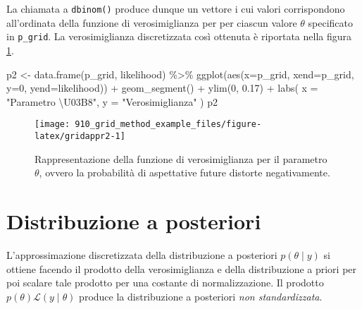 \documentclass[
]{memoir}
\newenvironment{Shaded}{\begin{snugshade}}{\end{snugshade}}
\newcommand{\AttributeTok}[1]{\textcolor[rgb]{0.77,0.63,0.00}{#1}}
\newcommand{\DecValTok}[1]{\textcolor[rgb]{0.00,0.00,0.81}{#1}}
\newcommand{\FloatTok}[1]{\textcolor[rgb]{0.00,0.00,0.81}{#1}}
\newcommand{\FunctionTok}[1]{\textcolor[rgb]{0.00,0.00,0.00}{#1}}
\newcommand{\NormalTok}[1]{#1}
\newcommand{\OtherTok}[1]{\textcolor[rgb]{0.56,0.35,0.01}{#1}}
\newcommand{\SpecialCharTok}[1]{\textcolor[rgb]{0.00,0.00,0.00}{#1}}
\newcommand{\StringTok}[1]{\textcolor[rgb]{0.31,0.60,0.02}{#1}}
\begin{document}
La chiamata a \texttt{dbinom()} produce dunque un vettore i cui valori corrispondono all'ordinata della funzione di verosimiglianza per per ciascun valore \(\theta\) specificato in \texttt{p\_grid}. La verosimiglianza discretizzata così ottenuta è riportata nella figura \ref{fig:gridappr2}.

\begin{Shaded}
\begin{Highlighting}[]
\NormalTok{p2 }\OtherTok{\textless{}{-}} \FunctionTok{data.frame}\NormalTok{(p\_grid, likelihood) }\SpecialCharTok{\%\textgreater{}\%}
  \FunctionTok{ggplot}\NormalTok{(}\FunctionTok{aes}\NormalTok{(}\AttributeTok{x=}\NormalTok{p\_grid, }\AttributeTok{xend=}\NormalTok{p\_grid, }\AttributeTok{y=}\DecValTok{0}\NormalTok{, }\AttributeTok{yend=}\NormalTok{likelihood)) }\SpecialCharTok{+}
  \FunctionTok{geom\_segment}\NormalTok{() }\SpecialCharTok{+}
  \FunctionTok{ylim}\NormalTok{(}\DecValTok{0}\NormalTok{, }\FloatTok{0.17}\NormalTok{) }\SpecialCharTok{+}
  \FunctionTok{labs}\NormalTok{(}
    \AttributeTok{x =} \StringTok{"Parametro \textbackslash{}U03B8"}\NormalTok{,}
    \AttributeTok{y =} \StringTok{"Verosimiglianza"}
\NormalTok{  )}
\NormalTok{p2}
\end{Highlighting}
\end{Shaded}

\begin{figure}

{\centering \texttt{[image: 910\_grid\_method\_example\_files/figure-latex/gridappr2-1]} 

}

\caption{Rappresentazione della funzione di verosimiglianza per il parametro $\theta$, ovvero la probabilità di aspettative future distorte negativamente.}\label{fig:gridappr2}
\end{figure}

\hypertarget{distribuzione-a-posteriori-1}{%
\section{Distribuzione a posteriori}\label{distribuzione-a-posteriori-1}}

L'approssimazione discretizzata della distribuzione a posteriori \(p(\theta \mid y)\) si ottiene facendo il prodotto della verosimiglianza e della distribuzione a priori per poi scalare tale prodotto per una costante di normalizzazione. Il prodotto \(p(\theta)\mathcal{L}(y \mid \theta)\) produce la distribuzione a posteriori \emph{non standardizzata}.
\end{document}
